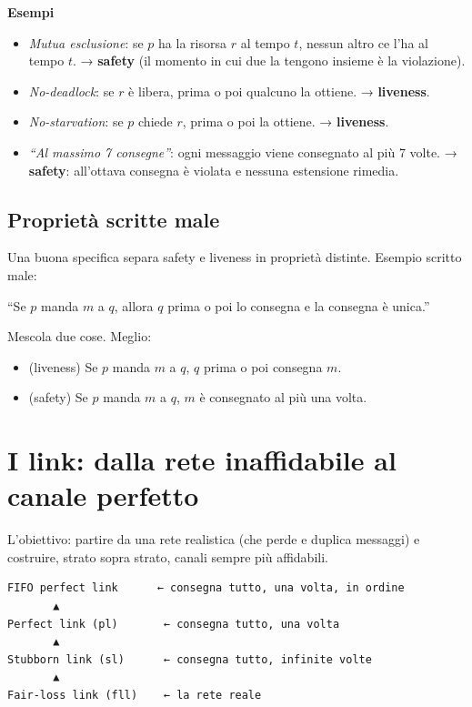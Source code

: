 \textbf{Esempi}

\begin{itemize}
\tightlist
\item
  \emph{Mutua esclusione}: se \(p\) ha la risorsa \(r\) al tempo \(t\), nessun altro ce l'ha al tempo \(t\). → \textbf{safety} (il momento in cui due la tengono insieme è la violazione).
\item
  \emph{No-deadlock}: se \(r\) è libera, prima o poi qualcuno la ottiene. → \textbf{liveness}.
\item
  \emph{No-starvation}: se \(p\) chiede \(r\), prima o poi la ottiene. → \textbf{liveness}.
\item
  \emph{``Al massimo 7 consegne''}: ogni messaggio viene consegnato al più 7 volte. → \textbf{safety}: all'ottava consegna è violata e nessuna estensione rimedia.
\end{itemize}

\subsection{Proprietà scritte male}

Una buona specifica separa safety e liveness in proprietà distinte. Esempio scritto male:

\begin{nota}

``Se \(p\) manda \(m\) a \(q\), allora \(q\) prima o poi lo consegna e la consegna è unica.''

\end{nota}

Mescola due cose. Meglio:

\begin{itemize}
\tightlist
\item
  (liveness) Se \(p\) manda \(m\) a \(q\), \(q\) prima o poi consegna \(m\).
\item
  (safety) Se \(p\) manda \(m\) a \(q\), \(m\) è consegnato al più una volta.
\end{itemize}

\section{I link: dalla rete inaffidabile al canale perfetto}

L'obiettivo: partire da una rete realistica (che perde e duplica messaggi) e costruire, strato sopra strato, canali sempre più affidabili.

\begin{verbatim}
FIFO perfect link      ← consegna tutto, una volta, in ordine
       ▲
Perfect link (pl)       ← consegna tutto, una volta
       ▲
Stubborn link (sl)      ← consegna tutto, infinite volte
       ▲
Fair-loss link (fll)    ← la rete reale
\end{verbatim}

